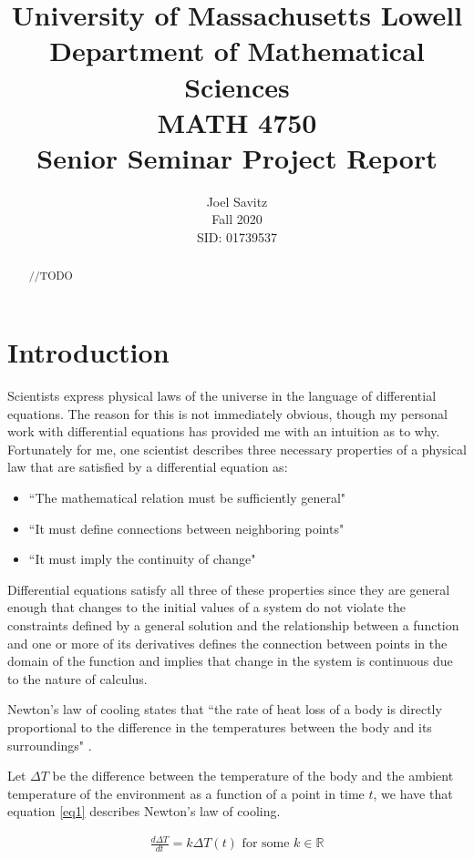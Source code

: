 \documentclass[12pt]{article}
\title{ University of Massachusetts Lowell \protect\\
	Department of Mathematical Sciences\protect\\
MATH 4750 \protect\\
Senior Seminar Project Report}
\author{Joel Savitz \\ Fall 2020 \\ SID: 01739537}
\newcommand{\reals}{\mathbb{R}}
\begin{document}
\maketitle

\begin{abstract}
//TODO
\end{abstract}

\section{Introduction}

Scientists express physical laws of
the universe in the language of differential equations.
The reason for this is not immediately obvious,
though my personal work with differential equations
has provided me with an intuition as to why.
Fortunately for me,
one scientist describes three necessary properties
of a physical law that are satisfied by a differential equation as: 


\begin{itemize}
	\item ``The mathematical relation must be sufficiently general"
	\item ``It must define connections between neighboring points"
	\item ``It must imply the continuity of change"\citep{whydiffeq}
\end{itemize}

Differential equations satisfy all three of these properties
since they are general enough that
changes to the initial values of a system
do not violate the constraints defined by a general solution
and the relationship between a function and one or more of its derivatives
defines the connection between points in the domain of the function
and implies that change in the system is continuous
due to the nature of calculus.


Newton's law of cooling states that
``the rate of heat loss of a body is
directly proportional to the difference
in the temperatures between the body and
its surroundings" \citep{wiki}.

Let $\Delta T$ be the difference between
the temperature of the body
and the ambient temperature of the environment
as a function of a point in time $t$,
we have that equation \ref{eq1}
describes Newton's law of cooling.

\begin{align} \label{eq1}
	\frac{d\Delta T}{dt} = k\Delta T(t) \textrm{ for some $k \in \reals$}
\end{align}
\end{document}
